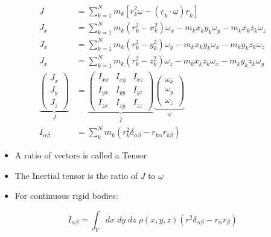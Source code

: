 \documentclass[a4paper,11pt,normalem]{article}
\begin{document}
\[
    \begin{aligned}
    \underline{J} &= \sum_{k = 1}^N m_k [r_k^2\underline{\omega} - (\underline{r}_k\cdot \underline{\omega})\underline{r}_k] \\
    J_x &= \sum_{k = 1}^N m_k (r_k^2 - x_k^2)\omega_x - m_kx_ky_k\omega_y - m_kx_kz_k\omega_z \\
    J_x &= \sum_{k = 1}^N m_k (r_k^2 - y_k^2)\omega_y - m_kx_ky_k\omega_x - m_ky_kz_k\omega_z \\
    J_x &= \sum_{k = 1}^N m_k (r_k^2 - z_k^2)\omega_z - m_kx_kz_k\omega_x - m_ky_kz_k\omega_y \\
    \underbrace{\begin{pmatrix} J_x \\ J_y \\ J_z \end{pmatrix}}_{\underline{J}} &= \underbrace{\begin{pmatrix} I_{xx} & I_{xy} & I_{xz} \\ I_{yx} & I_{yy} & I_{yz} \\ I_{zx} & I_{zy} & I_{zz} \end{pmatrix}}_{\hat{I}}\underbrace{\begin{pmatrix} \omega_x \\ \omega_y \\ \omega_z \end{pmatrix}}_{\underline{\omega}} \\
    I_{\alpha\beta} &= \sum_k^N m_k(r_k^2 \delta_{\alpha\beta} - r_{k\alpha}r_{k\beta})
    \end{aligned}
\]

\begin{itemize}
\item
  A ratio of vectors is called a Tensor
\item
  The Inertial tensor is the ratio of \(\underline{J}\) to
  \(\underline{\omega}\)
\item
  For continuous rigid bodies:
\end{itemize}

\[
    I_{\alpha\beta} = \int_V dx\;dy\;dz\;\rho(x,y,z)(r^2\delta_{\alpha\beta} - r_\alpha r_\beta)
\]
\end{document}
